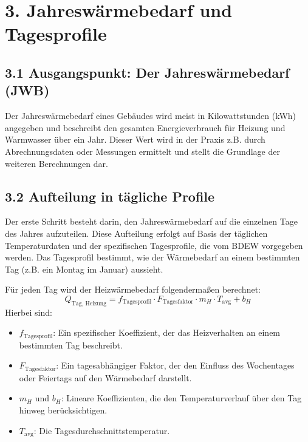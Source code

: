 \documentclass{article}
\begin{document}
\section*{3. Jahreswärmebedarf und Tagesprofile}

\subsection*{3.1 Ausgangspunkt: Der Jahreswärmebedarf (JWB)}
Der Jahreswärmebedarf eines Gebäudes wird meist in Kilowattstunden (kWh) angegeben und beschreibt den gesamten Energieverbrauch für Heizung und Warmwasser über ein Jahr. Dieser Wert wird in der Praxis z.B. durch Abrechnungsdaten oder Messungen ermittelt und stellt die Grundlage der weiteren Berechnungen dar.

\subsection*{3.2 Aufteilung in tägliche Profile}
Der erste Schritt besteht darin, den Jahreswärmebedarf auf die einzelnen Tage des Jahres aufzuteilen. Diese Aufteilung erfolgt auf Basis der täglichen Temperaturdaten und der spezifischen Tagesprofile, die vom BDEW vorgegeben werden. Das Tagesprofil bestimmt, wie der Wärmebedarf an einem bestimmten Tag (z.B. ein Montag im Januar) aussieht.

Für jeden Tag wird der Heizwärmebedarf folgendermaßen berechnet:
\[
Q_{\text{Tag, Heizung}} = f_{\text{Tagesprofil}} \cdot F_{\text{Tagesfaktor}} \cdot m_H \cdot T_{\text{avg}} + b_H
\]
\noindent
Hierbei sind:
\begin{itemize}
    \item \( f_{\text{Tagesprofil}} \): Ein spezifischer Koeffizient, der das Heizverhalten an einem bestimmten Tag beschreibt.
    \item \( F_{\text{Tagesfaktor}} \): Ein tagesabhängiger Faktor, der den Einfluss des Wochentages oder Feiertags auf den Wärmebedarf darstellt.
    \item \( m_H \) und \( b_H \): Lineare Koeffizienten, die den Temperaturverlauf über den Tag hinweg berücksichtigen.
    \item \( T_{\text{avg}} \): Die Tagesdurchschnittstemperatur.
\end{itemize}
\end{document}
